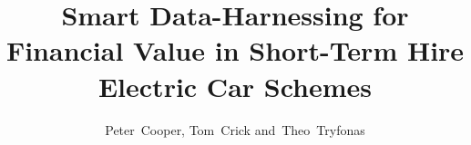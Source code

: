 \documentclass[journal]{IEEEtran}
\begin{document}
%
\title{Smart Data-Harnessing for Financial Value in Short-Term Hire Electric Car Schemes}
%
%
%

\author{Peter~Cooper, Tom~Crick and~Theo~Tryfonas}%

% 
%
\end{document}
